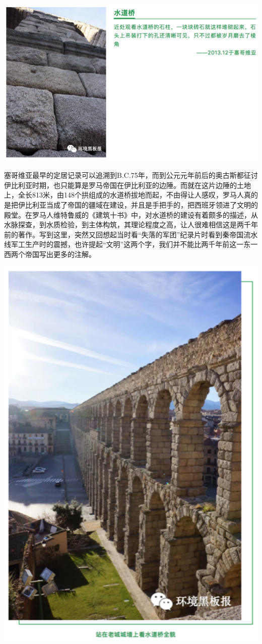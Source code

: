 \documentclass[
]{book}
\begin{document}
\includegraphics[width=8.33in]{images/xt47}

塞哥维亚最早的定居记录可以追溯到B.C.75年，而到公元元年前后的奥古斯都征讨伊比利亚时期，也只能算是罗马帝国在伊比利亚的边陲。而就在这片边陲的土地上，全长813米，由148个拱组成的水道桥拔地而起，不由得让人感叹，罗马人真的是把伊比利亚当成了帝国的疆域在建设，并且是手把手的，把西班牙领进了文明的殿堂。在罗马人维特鲁威的《建筑十书》中，对水道桥的建设有着颇多的描述，从水脉探查，到水质检验，到主体构筑，其理论程度之高，让人很难相信这是两千年前的著作。写到这里，突然又回想起当时看``失落的军团''纪录片时看到秦帝国流水线军工生产时的震撼，也许提起``文明''这两个字，我们并不能比两千年前这一东一西两个帝国写出更多的注解。

\includegraphics[width=5.67in]{images/xt48}
\end{document}
